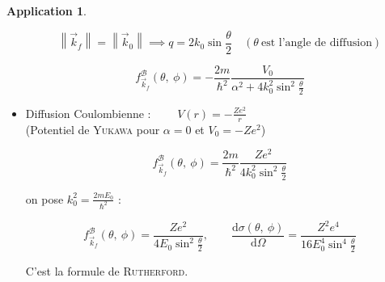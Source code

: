\documentclass[12pt,a4paper,oneside,french]{book}
\newcommand{\diff}{\mathrm{d}}
\theoremstyle{definition}
\theoremstyle{definition}
\theoremstyle{definition}
\theoremstyle{remark}
\theoremstyle{definition}
\newtheorem*{application}{Application}
\begin{document}
\begin{application}
\begin{itemize}
\begin{figure}[H]
            \end{figure}
            
            \begin{equation*}
                \left\lVert{\vec{k}}_{f}\right\rVert = \left\lVert{\vec{k}}_{0}\right\rVert \implies q = 2 {k}_{0} \sin{\frac{\theta}{2}} \quad \left(\theta \ \text{est l'angle de diffusion}\right)
            \end{equation*}
            
            \begin{equation*}
                {f}_{{\vec{k}}_{f}}^{\mathcal{B}}(\theta, \ \phi) = -\frac{2m}{{\hbar}^{2}} \frac{{V}_{0}}{{\alpha}^{2} + 4 {k}_{0}^{2} \sin^{2} \frac{\theta}{2}}
            \end{equation*}
            
            \item 
            Diffusion Coulombienne : $\qquad V(r) = -\frac{Z {e}^{2}}{r}$ \\
            (Potentiel de \textsc{Yukawa} pour $\alpha = 0$ et ${V}_{0} = -Z {e}^{2}$)
            
            \begin{equation*}
                {f}_{{\vec{k}}_{f}}^{\mathcal{B}}(\theta, \ \phi) = \frac{2m}{{\hbar}^{2}} \frac{Z {e}^{2}}{4 {k}_{0}^{2} \sin^{2} \frac{\theta}{2}}
            \end{equation*}
            
            on pose ${k}_{0}^{2} = \frac{2m {E}_{0}}{{\hbar}^{2}}$ :
            
            \begin{equation*}
                {f}_{{\vec{k}}_{f}}^{\mathcal{B}}(\theta, \ \phi) = \frac{Z {e}^{2}}{4 {E}_{0} \sin^{2} \frac{\theta}{2}}, \qquad \frac{\diff \sigma(\theta, \ \phi)}{\diff \Omega} = \frac{{Z}^{2} {e}^{4}}{16 {E}_{0}^{4} \sin^{4} \frac{\theta}{2}}
            \end{equation*}
            
            C'est la formule de \textsc{Rutherford}.
            
        \end{itemize}
    \end{application}
    
\end{document}
